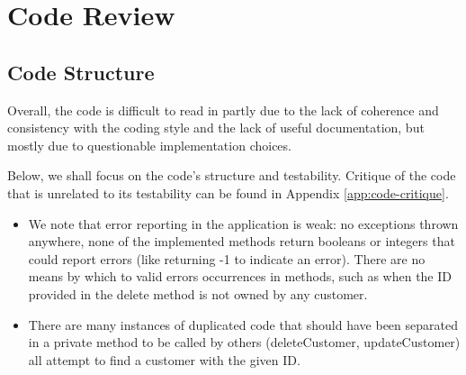 \section{Code Review}


\subsection{Code Structure} 
\label{sec:code-structure}
Overall, the code is difficult to read in partly due to the lack of coherence and consistency with the coding style and the lack of useful documentation, but mostly due to questionable implementation choices. 

Below, we shall focus on the code's structure and testability. Critique of the code that is unrelated to its testability can be found in Appendix \ref{app:code-critique}. 

\begin{itemize}
	\item We note that error reporting in the application is weak: no exceptions thrown anywhere, none of the implemented methods return booleans or integers that could report errors (like returning -1 to indicate an error). There are no means by which  to valid errors occurrences in methods, such as when the ID provided in the delete method is not owned by any customer. 
	\item There are many instances of duplicated code that should have been separated in a private method to be called by others (deleteCustomer, updateCustomer) all attempt to find a customer with the given ID. 
\end{itemize}


